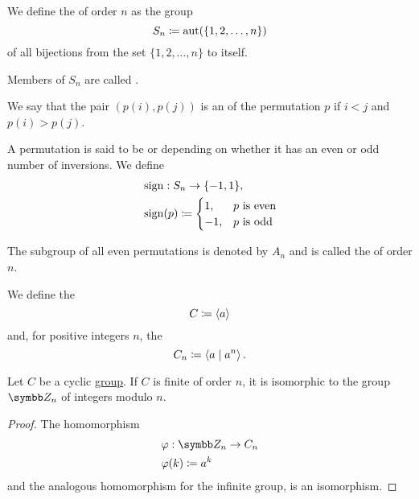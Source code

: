 \begin{definition}\label{def:symmetric_group}
  We define the  of order \( n \) as the group
  \begin{equation*}
    S_n \coloneqq \operatorname{aut}(\{ 1, 2, \ldots, n \})
  \end{equation*}
  of all bijections from the set \( \{ 1, 2, \ldots, n \} \) to itself.

  Members of \( S_n \) are called .

  We say that the pair \( (p(i), p(j)) \) is an  of the permutation \( p \) if \( i < j \) and \( p(i) > p(j) \).

  A permutation is said to be  or  depending on whether it has an even or odd number of inversions. We define
  \begin{align*}
    &\operatorname{sign}: S_n \to \{ -1, 1 \}, \\
    &\operatorname{sign}(p) \coloneqq \begin{cases}
      1, &p \text{ is even} \\
      -1, &p \text{ is odd}
    \end{cases}
  \end{align*}

  The subgroup of all even permutations is denoted by \( A_n \) and is called the  of order \( n \).
\end{definition}

\begin{definition}\label{def:cyclic_group}
  We define the 
  \begin{equation*}
    C \coloneqq \left\langle a \right\rangle
  \end{equation*}
  and, for positive integers \( n \), the 
  \begin{equation*}
    C_n \coloneqq \left\langle a \mid a^n \right\rangle.
  \end{equation*}
\end{definition}

\begin{proposition}\label{thm:cyclic_group_isomorphic_to_integers_modulo_n}
  Let \( C \) be a cyclic \hyperref[def:cyclic_group]{group}. If \( C \) is finite of order \( n \), it is isomorphic to the group \( \BZ_n \) of integers modulo \( n \).
\end{proposition}
\begin{proof}
  The homomorphism
  \begin{align*}
    &\varphi: \BZ_n \to C_n \\
    &\varphi(k) \coloneqq a^k
  \end{align*}
  and the analogous homomorphism for the infinite group, is an isomorphism.
\end{proof}

